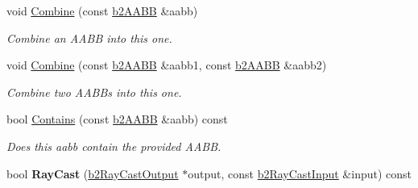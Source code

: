 \begin{DoxyCompactItemize}
\mbox{\label{structb2_a_a_b_b_ad551edba62d2ad6094672a9ba3e26496}} 
void \hyperlink{structb2_a_a_b_b_ad551edba62d2ad6094672a9ba3e26496}{Combine} (const \hyperlink{structb2_a_a_b_b}{b2\+A\+A\+BB} \&aabb)
\begin{DoxyCompactList}\small\item\em Combine an A\+A\+BB into this one. \end{DoxyCompactList}\item 
\mbox{\label{structb2_a_a_b_b_a34b9c7d824df845c10caa9c12ae90452}} 
void \hyperlink{structb2_a_a_b_b_a34b9c7d824df845c10caa9c12ae90452}{Combine} (const \hyperlink{structb2_a_a_b_b}{b2\+A\+A\+BB} \&aabb1, const \hyperlink{structb2_a_a_b_b}{b2\+A\+A\+BB} \&aabb2)
\begin{DoxyCompactList}\small\item\em Combine two A\+A\+B\+Bs into this one. \end{DoxyCompactList}\item 
\mbox{\label{structb2_a_a_b_b_acf98175d3a53bca755d5c4852fa85a00}} 
bool \hyperlink{structb2_a_a_b_b_acf98175d3a53bca755d5c4852fa85a00}{Contains} (const \hyperlink{structb2_a_a_b_b}{b2\+A\+A\+BB} \&aabb) const
\begin{DoxyCompactList}\small\item\em Does this aabb contain the provided A\+A\+BB. \end{DoxyCompactList}\item 
\mbox{\label{structb2_a_a_b_b_af6a8b26716ec07d326e5ce95556e8c7e}} 
bool {\bfseries Ray\+Cast} (\hyperlink{structb2_ray_cast_output}{b2\+Ray\+Cast\+Output} $\ast$output, const \hyperlink{structb2_ray_cast_input}{b2\+Ray\+Cast\+Input} \&input) const
\end{DoxyCompactItemize}
